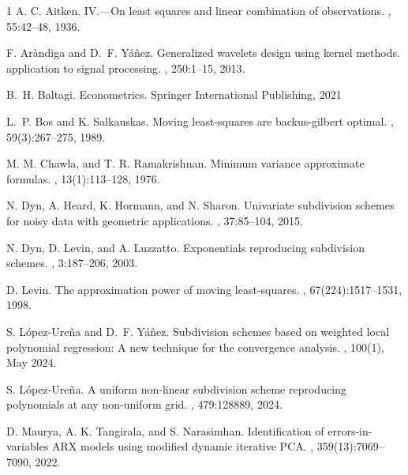 \documentclass[preprint]{elsarticle}       %
\theoremstyle{plain}
\theoremstyle{remark}
\begin{document}

% 
{\small
\begin{thebibliography}{1}
    A. C. Aitken.
    \newblock IV.—On least squares and linear combination of observations.
    , 55:42--48, 1936.
	
	F. Ar{\`a}ndiga and D.~F. Y{\'a}{\~n}ez.
	\newblock Generalized wavelets design using kernel methods. application to signal processing.
	, 250:1--15, 2013.

	B.~H. Baltagi.
	\newblock Econometrics.
	\newblock Springer International Publishing,  2021

    
	L.~P. Bos and K. Salkauskas.
	\newblock Moving least-squares are backus-gilbert optimal.
	, 59(3):267--275, 1989.

    M. M. Chawla, and T. R. Ramakrishnan.
    \newblock Minimum variance approximate formulas.
    , 13(1):113--128, 1976.
	
	N. Dyn, A. Heard, K. Hormann, and N. Sharon.
	\newblock Univariate subdivision schemes for noisy data with geometric applications.
	, 37:85--104, 2015.
	
	N. Dyn, D. Levin, and A. Luzzatto.
	\newblock Exponentials reproducing subdivision schemes.
	, 3:187--206, 2003.
	
	D. Levin.
	\newblock The approximation power of moving least-squares.
	, 67(224):1517--1531, 1998.
	
	S. L\'{o}pez-Ure\~{n}a and D.~F. Y\'{a}\~{n}ez.
	\newblock Subdivision schemes based on weighted local polynomial regression: A new technique for the convergence analysis.
	, 100(1), May 2024.
	
	S. L{\'o}pez-Ure{\~n}a.
	\newblock A uniform non-linear subdivision scheme reproducing polynomials at any non-uniform grid.
	, 479:128889, 2024.

	D. Maurya, A. K. Tangirala, and S. Narasimhan.
	\newblock Identification of errors-in-variables ARX models using modified dynamic iterative PCA.
	, 359(13):7069--7090, 2022.


\end{thebibliography}}
\end{document}
